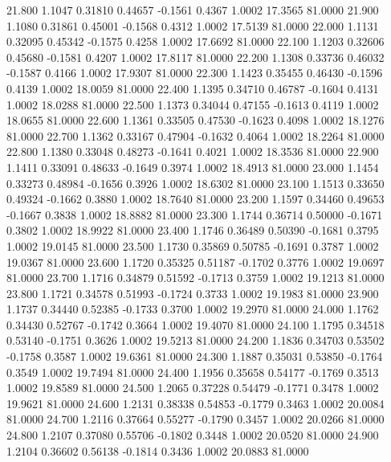   21.800   1.1047   0.31810   0.44657  -0.1561   0.4367   1.0002  17.3565  81.0000
  21.900   1.1080   0.31861   0.45001  -0.1568   0.4312   1.0002  17.5139  81.0000
  22.000   1.1131   0.32095   0.45342  -0.1575   0.4258   1.0002  17.6692  81.0000
  22.100   1.1203   0.32606   0.45680  -0.1581   0.4207   1.0002  17.8117  81.0000
  22.200   1.1308   0.33736   0.46032  -0.1587   0.4166   1.0002  17.9307  81.0000
  22.300   1.1423   0.35455   0.46430  -0.1596   0.4139   1.0002  18.0059  81.0000
  22.400   1.1395   0.34710   0.46787  -0.1604   0.4131   1.0002  18.0288  81.0000
  22.500   1.1373   0.34044   0.47155  -0.1613   0.4119   1.0002  18.0655  81.0000
  22.600   1.1361   0.33505   0.47530  -0.1623   0.4098   1.0002  18.1276  81.0000
  22.700   1.1362   0.33167   0.47904  -0.1632   0.4064   1.0002  18.2264  81.0000
  22.800   1.1380   0.33048   0.48273  -0.1641   0.4021   1.0002  18.3536  81.0000
  22.900   1.1411   0.33091   0.48633  -0.1649   0.3974   1.0002  18.4913  81.0000
  23.000   1.1454   0.33273   0.48984  -0.1656   0.3926   1.0002  18.6302  81.0000
  23.100   1.1513   0.33650   0.49324  -0.1662   0.3880   1.0002  18.7640  81.0000
  23.200   1.1597   0.34460   0.49653  -0.1667   0.3838   1.0002  18.8882  81.0000
  23.300   1.1744   0.36714   0.50000  -0.1671   0.3802   1.0002  18.9922  81.0000
  23.400   1.1746   0.36489   0.50390  -0.1681   0.3795   1.0002  19.0145  81.0000
  23.500   1.1730   0.35869   0.50785  -0.1691   0.3787   1.0002  19.0367  81.0000
  23.600   1.1720   0.35325   0.51187  -0.1702   0.3776   1.0002  19.0697  81.0000
  23.700   1.1716   0.34879   0.51592  -0.1713   0.3759   1.0002  19.1213  81.0000
  23.800   1.1721   0.34578   0.51993  -0.1724   0.3733   1.0002  19.1983  81.0000
  23.900   1.1737   0.34440   0.52385  -0.1733   0.3700   1.0002  19.2970  81.0000
  24.000   1.1762   0.34430   0.52767  -0.1742   0.3664   1.0002  19.4070  81.0000
  24.100   1.1795   0.34518   0.53140  -0.1751   0.3626   1.0002  19.5213  81.0000
  24.200   1.1836   0.34703   0.53502  -0.1758   0.3587   1.0002  19.6361  81.0000
  24.300   1.1887   0.35031   0.53850  -0.1764   0.3549   1.0002  19.7494  81.0000
  24.400   1.1956   0.35658   0.54177  -0.1769   0.3513   1.0002  19.8589  81.0000
  24.500   1.2065   0.37228   0.54479  -0.1771   0.3478   1.0002  19.9621  81.0000
  24.600   1.2131   0.38338   0.54853  -0.1779   0.3463   1.0002  20.0084  81.0000
  24.700   1.2116   0.37664   0.55277  -0.1790   0.3457   1.0002  20.0266  81.0000
  24.800   1.2107   0.37080   0.55706  -0.1802   0.3448   1.0002  20.0520  81.0000
  24.900   1.2104   0.36602   0.56138  -0.1814   0.3436   1.0002  20.0883  81.0000
